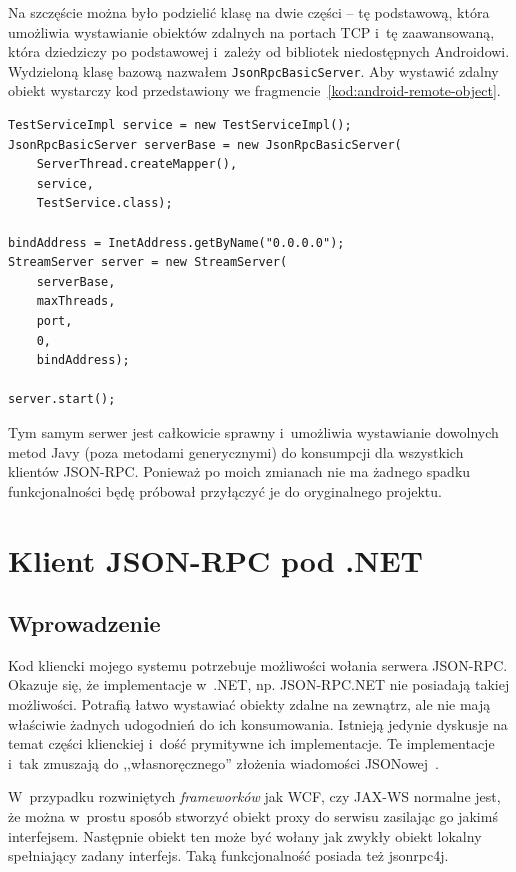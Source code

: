 Na szczęście można było podzielić klasę na dwie części -- tę podstawową, która umożliwia wystawianie obiektów zdalnych na portach TCP i~tę zaawansowaną, która dziedziczy po podstawowej i~zależy od bibliotek niedostępnych Androidowi.
Wydzieloną klasę bazową nazwałem \texttt{JsonRpcBasicServer}. Aby wystawić zdalny obiekt wystarczy kod przedstawiony we fragmencie~\ref{kod:android-remote-object}.

\begin{lstlisting}[float, frame=single, caption={Tworzenie obiektu zdalnego przy pomocy jsonrpc4j dostosowanego do Androida.}, label=kod:android-remote-object]
TestServiceImpl service = new TestServiceImpl();
JsonRpcBasicServer serverBase = new JsonRpcBasicServer(
    ServerThread.createMapper(),
    service,
    TestService.class);
		
bindAddress = InetAddress.getByName("0.0.0.0");
StreamServer server = new StreamServer(
    serverBase,
    maxThreads,
    port,
    0,
    bindAddress);

server.start();
\end{lstlisting}

Tym samym serwer jest całkowicie sprawny i~umożliwia wystawianie dowolnych metod Javy (poza metodami generycznymi) do konsumpcji dla wszystkich klientów JSON-RPC.
Ponieważ po moich zmianach nie ma żadnego spadku funkcjonalności będę próbował przyłączyć je do oryginalnego projektu.



\section{Klient JSON-RPC pod .NET}
\subsection{Wprowadzenie}
Kod kliencki mojego systemu potrzebuje możliwości wołania serwera JSON-RPC.
Okazuje się, że implementacje w~.NET, np. JSON-RPC.NET nie posiadają takiej możliwości.
Potrafią łatwo wystawiać obiekty zdalne na zewnątrz, ale nie mają właściwie żadnych udogodnień do ich konsumowania.
Istnieją jedynie dyskusje na temat części klienckiej i~dość prymitywne ich implementacje.
Te implementacje i~tak zmuszają do ,,własnoręcznego'' złożenia wiadomości JSONowej~\cite{json-rpc-net-client}.

W~przypadku rozwiniętych \emph{frameworków} jak WCF, czy JAX-WS normalne jest, że można w~prostu sposób stworzyć obiekt proxy do serwisu zasilając go jakimś interfejsem.
Następnie obiekt ten może być wołany jak zwykły obiekt lokalny spełniający zadany interfejs.
Taką funkcjonalność posiada też jsonrpc4j.

